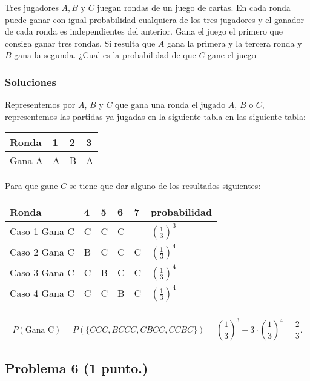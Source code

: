 \documentclass[
]{article}
\begin{document}
Tres jugadores \(A,B\) y \(C\) juegan rondas de un juego de cartas. En
cada ronda puede ganar con igual probabilidad cualquiera de los tres
jugadores y el ganador de cada ronda es independientes del anterior.
Gana el juego el primero que consiga ganar tres rondas. Si resulta que
\(A\) gana la primera y la tercera ronda y \(B\) gana la segunda. ¿Cual
es la probabilidad de que \(C\) gane el juego

\hypertarget{soluciones}{%
\subsubsection{Soluciones}\label{soluciones}}

Representemos por \(A\), \(B\) y \(C\) que gana una ronda el jugado
\(A\), \(B\) o \(C\), representemos las partidas ya jugadas en la
siguiente tabla en las siguiente tabla:

\begin{tabular}{|l||l|l|l|}
\hline
Ronda & 1 & 2 & 3\\\hline\hline
Gana A & A & B & A\\ \hline
\end{tabular}

Para que gane \(C\) se tiene que dar alguno de los resultados
siguientes:

\begin{tabular}{|l||l|l|l|l|l|}
\hline
Ronda & 4 & 5 & 6 & 7 & probabilidad \\\hline\hline
Caso 1 Gana C & C & C & C & -  & $\left(\frac{1}{3}\right)^3$\\ \hline
Caso 2 Gana C & B & C & C & C  & $\left(\frac{1}{3}\right)^4$\\ \hline
Caso 3 Gana C & C & B & C & C  & $\left(\frac{1}{3}\right)^4$\\ \hline
Caso 4 Gana C & C & C & B & C  & $\left(\frac{1}{3}\right)^4$\\ \hline
\\\hline
\end{tabular}

\[P(\mbox{Gana C})= P(\{CCC,BCCC,CBCC,CCBC\})=
\left(\frac{1}{3}\right)^3 + 3\cdot \left(\frac{1}{3}\right)^4=\frac{2}{3}.\]

\hypertarget{problema-6}{%
\subsection{\texorpdfstring{Problema 6
(\textbf{1 punto.})}{Problema 6 ()}}\label{problema-6}}
\end{document}
